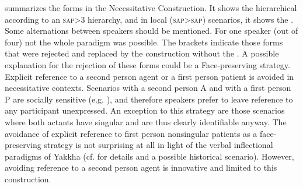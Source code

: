  summarizes the  forms in the Necessitative Construction. It shows the hierarchical  according to an \textsc{sap}>3 hierarchy, and in local (\textsc{sap}>\textsc{sap}) scenarios, it shows the  . Some alternations between speakers should be mentioned. For one speaker (out of four) not the whole paradigm was possible. The brackets indicate those forms that were rejected and replaced by the construction without the . A possible explanation for the rejection of these forms could be a Face-preserving strategy. Explicit reference to a second person agent or a first person patient is avoided in necessitative contexts. Scenarios with a second person A and with a first person P are socially sensitive (e.g. ), and therefore speakers prefer to leave reference to any participant unexpressed. An exception to this strategy are those scenarios where both actants have singular  and  are thus clearly identifiable anyway. The avoidance of explicit reference to first person nonsingular patients as a face-preserving strategy is not surprising at all in light of the verbal inflectional paradigms of Yakkha (cf.  for details and a possible historical scenario). However, avoiding reference to a second person agent is innovative and limited to this construction.



